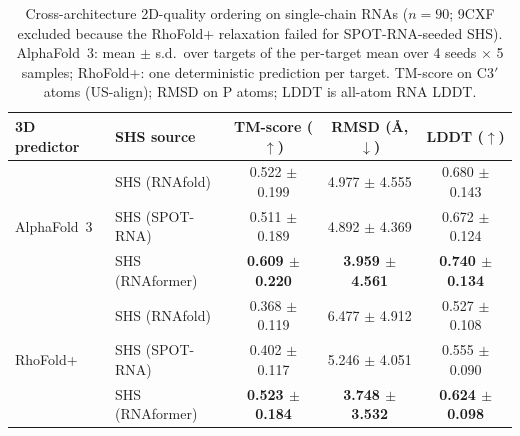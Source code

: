 \begin{table}[t]
\centering
\caption{Cross-architecture 2D-quality ordering on single-chain RNAs ($n{=}90$; 9CXF excluded because the RhoFold+ relaxation failed for SPOT-RNA-seeded SHS). AlphaFold~3: mean $\pm$ s.d.\ over targets of the per-target mean over 4 seeds $\times$ 5 samples; RhoFold+: one deterministic prediction per target. TM-score on C3$'$ atoms (US-align); RMSD on P atoms; LDDT is all-atom RNA LDDT.}
\label{tab:order_rna_single_chain}
\begin{tabular}{llccc}
\toprule
3D predictor & SHS source & TM-score ($\uparrow$) & RMSD (\AA, $\downarrow$) & LDDT ($\uparrow$) \\
\midrule
\multirow{3}{*}{AlphaFold~3} & SHS (RNAfold) & 0.522 $\pm$ 0.199 & 4.977 $\pm$ 4.555 & 0.680 $\pm$ 0.143 \\
 & SHS (SPOT-RNA) & 0.511 $\pm$ 0.189 & 4.892 $\pm$ 4.369 & 0.672 $\pm$ 0.124 \\
 & SHS (RNAformer) & \textbf{0.609 $\pm$ 0.220} & \textbf{3.959 $\pm$ 4.561} & \textbf{0.740 $\pm$ 0.134} \\
\midrule
\multirow{3}{*}{RhoFold+} & SHS (RNAfold) & 0.368 $\pm$ 0.119 & 6.477 $\pm$ 4.912 & 0.527 $\pm$ 0.108 \\
 & SHS (SPOT-RNA) & 0.402 $\pm$ 0.117 & 5.246 $\pm$ 4.051 & 0.555 $\pm$ 0.090 \\
 & SHS (RNAformer) & \textbf{0.523 $\pm$ 0.184} & \textbf{3.748 $\pm$ 3.532} & \textbf{0.624 $\pm$ 0.098} \\
\bottomrule
\end{tabular}
\end{table}

